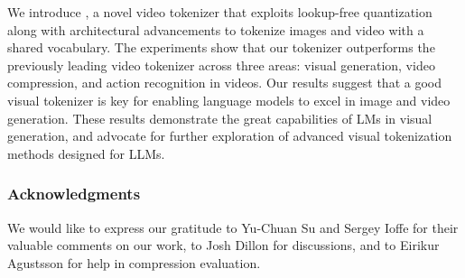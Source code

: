 We introduce \modelname{}, a novel video tokenizer that exploits lookup-free quantization along with architectural advancements to tokenize images and video with a shared vocabulary. The experiments show that our tokenizer outperforms the previously leading video tokenizer across three areas: visual generation, video compression, and action recognition in videos. Our results suggest that a good visual tokenizer is key for enabling language models to excel in image and video generation. These results demonstrate the great capabilities of LMs in visual generation, and advocate for further exploration of advanced visual tokenization methods designed for LLMs.

\subsubsection*{Acknowledgments}
We would like to express our gratitude to Yu-Chuan Su and Sergey Ioffe for their valuable comments on our work, to Josh Dillon for discussions, 
and to Eirikur Agustsson for help in compression evaluation.

\clearpage

